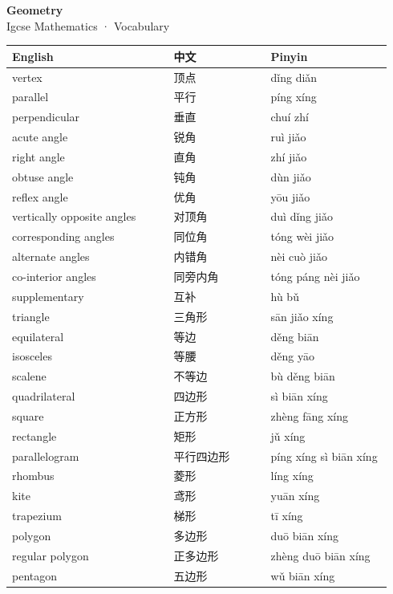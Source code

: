 \documentclass[11pt]{article}
\begin{document}
\begin{center}
  {\LARGE\bfseries Geometry}\\[0.35em]
  {\large Igcse Mathematics · Vocabulary}
\end{center}
\vspace{0.6em}

\begin{longtable}{@{}p{0.40\linewidth}p{0.24\linewidth}p{0.30\linewidth}@{}}
\toprule
\textbf{English} & \textbf{中文} & \textbf{Pinyin} \\
\midrule
\endhead
\bottomrule
\endlastfoot
vertex & 顶点 & dǐng diǎn \\
parallel & 平行 & píng xíng \\
perpendicular & 垂直 & chuí zhí \\
acute angle & 锐角 & ruì jiǎo \\
right angle & 直角 & zhí jiǎo \\
obtuse angle & 钝角 & dùn jiǎo \\
reflex angle & 优角 & yōu jiǎo \\
vertically opposite angles & 对顶角 & duì dǐng jiǎo \\
corresponding angles & 同位角 & tóng wèi jiǎo \\
alternate angles & 内错角 & nèi cuò jiǎo \\
co-interior angles & 同旁内角 & tóng páng nèi jiǎo \\
supplementary & 互补 & hù bǔ \\
triangle & 三角形 & sān jiǎo xíng \\
equilateral & 等边 & děng biān \\
isosceles & 等腰 & děng yāo \\
scalene & 不等边 & bù děng biān \\
quadrilateral & 四边形 & sì biān xíng \\
square & 正方形 & zhèng fāng xíng \\
rectangle & 矩形 & jǔ xíng \\
parallelogram & 平行四边形 & píng xíng sì biān xíng \\
rhombus & 菱形 & líng xíng \\
kite & 鸢形 & yuān xíng \\
trapezium & 梯形 & tī xíng \\
polygon & 多边形 & duō biān xíng \\
regular polygon & 正多边形 & zhèng duō biān xíng \\
pentagon & 五边形 & wǔ biān xíng \\

\end{longtable}
\end{document}
